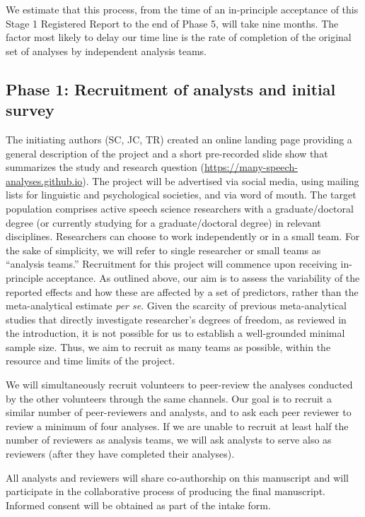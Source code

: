 \documentclass[
  12pt,
]{article}
\begin{document}
We estimate that this process, from the time of an in-principle acceptance of this Stage 1 Registered Report to the end of Phase 5, will take nine months.
The factor most likely to delay our time line is the rate of completion of the original set of analyses by independent analysis teams.

\hypertarget{phase-1-recruitment-of-analysts-and-initial-survey}{%
\subsection{Phase 1: Recruitment of analysts and initial survey}\label{phase-1-recruitment-of-analysts-and-initial-survey}}

The initiating authors (SC, JC, TR) created an online landing page providing a general description of the project and a short pre-recorded slide show that summarizes the study and research question (\url{https://many-speech-analyses.github.io}).
The project will be advertised via social media, using mailing lists for linguistic and psychological societies, and via word of mouth.
The target population comprises active speech science researchers with a graduate/doctoral degree (or currently studying for a graduate/doctoral degree) in relevant disciplines.
Researchers can choose to work independently or in a small team.
For the sake of simplicity, we will refer to single researcher or small teams as ``analysis teams.''
Recruitment for this project will commence upon receiving in-principle acceptance.
As outlined above, our aim is to assess the variability of the reported effects and how these are affected by a set of predictors, rather than the meta-analytical estimate \emph{per se}.
Given the scarcity of previous meta-analytical studies that directly investigate researcher's degrees of freedom, as reviewed in the introduction, it is not possible for us to establish a well-grounded minimal sample size.
Thus, we aim to recruit as many teams as possible, within the resource and time limits of the project.

We will simultaneously recruit volunteers to peer-review the analyses conducted by the other volunteers through the same channels.
Our goal is to recruit a similar number of peer-reviewers and analysts, and to ask each peer reviewer to review a minimum of four analyses.
If we are unable to recruit at least half the number of reviewers as analysis teams, we will ask analysts to serve also as reviewers (after they have completed their analyses).

All analysts and reviewers will share co-authorship on this manuscript and will participate in the collaborative process of producing the final manuscript.
Informed consent will be obtained as part of the intake form.
\end{document}
